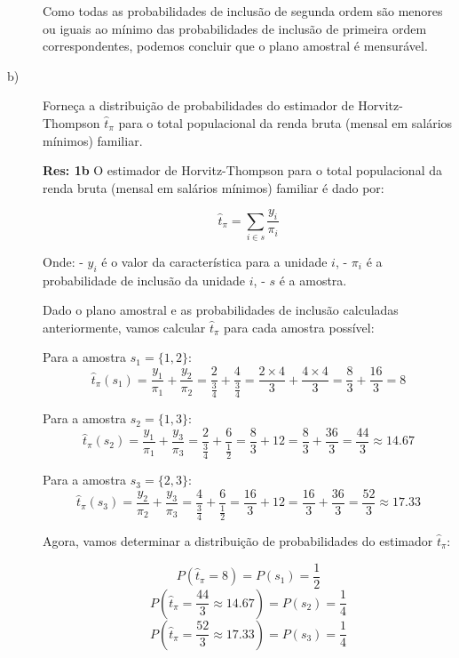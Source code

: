 \documentclass[a4paper,11pt,oneside,twocolumn]{Config/milktest}
\begin{document}
\begin{description}
{			Como todas as probabilidades de inclusão de segunda ordem são menores ou iguais ao mínimo das probabilidades de inclusão de primeira ordem correspondentes, podemos concluir que o plano amostral é mensurável.
		}
		
		
		\item[b)] Forneça a distribuição de probabilidades do estimador de Horvitz-Thompson $\hat{t}_\pi$ para o total populacional da renda bruta (mensal em salários mínimos) familiar.
		
		\medskip
		{\scriptsize
			
			\textbf{Res:  1b} O estimador de Horvitz-Thompson para o total populacional da renda bruta (mensal em salários mínimos) familiar é dado por:
			
			\[
			\hat{t}_\pi = \sum_{i \in s} \frac{y_i}{\pi_i}
			\]
			
			Onde:
			- \(y_i\) é o valor da característica para a unidade \(i\),
			- \(\pi_i\) é a probabilidade de inclusão da unidade \(i\),
			- \(s\) é a amostra.
			
			Dado o plano amostral e as probabilidades de inclusão calculadas anteriormente, vamos calcular \(\hat{t}_\pi\) para cada amostra possível:
			
			Para a amostra \(s_1 = \{1, 2\}\):
			\[
			\hat{t}_\pi(s_1) = \frac{y_1}{\pi_1} + \frac{y_2}{\pi_2} = \frac{2}{\frac{3}{4}} + \frac{4}{\frac{3}{4}} = \frac{2 \times 4}{3} + \frac{4 \times 4}{3} = \frac{8}{3} + \frac{16}{3} = 8
			\]
			
			Para a amostra \(s_2 = \{1, 3\}\):
			\[
			\hat{t}_\pi(s_2) = \frac{y_1}{\pi_1} + \frac{y_3}{\pi_3} = \frac{2}{\frac{3}{4}} + \frac{6}{\frac{1}{2}} = \frac{8}{3} + 12 = \frac{8}{3} + \frac{36}{3} = \frac{44}{3} \approx 14.67
			\]
			
			Para a amostra \(s_3 = \{2, 3\}\):
			\[
			\hat{t}_\pi(s_3) = \frac{y_2}{\pi_2} + \frac{y_3}{\pi_3} = \frac{4}{\frac{3}{4}} + \frac{6}{\frac{1}{2}} = \frac{16}{3} + 12 = \frac{16}{3} + \frac{36}{3} = \frac{52}{3} \approx 17.33
			\]
			
			Agora, vamos determinar a distribuição de probabilidades do estimador \(\hat{t}_\pi\):
			
			\[
			P\left(\hat{t}_\pi = 8\right) = P(s_1) = \frac{1}{2}
			\]
			\[
			P\left(\hat{t}_\pi = \frac{44}{3} \approx 14.67\right) = P(s_2) = \frac{1}{4}
			\]
			\[
			P\left(\hat{t}_\pi = \frac{52}{3} \approx 17.33\right) = P(s_3) = \frac{1}{4}
			\]
			
}
\end{description}
\end{document}
